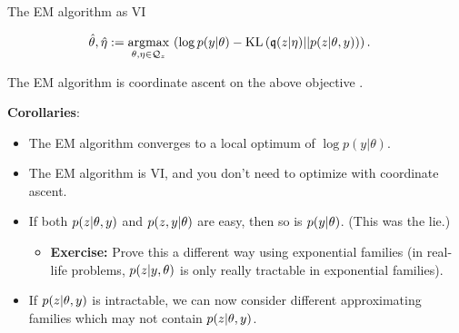 \begin{frame}{The EM algorithm as VI}

\begin{align*}
%
\thetahat, \etaopt :={}& \argmax{\theta, \eta \in \qdom_z} \left(
\log p(\y | \theta) -
    \kl{\q(\z | \eta)}{p(\z | \theta, \y)}  \right).
%
\end{align*}
%

The EM algorithm is coordinate ascent on the above objective
\citep{neal1998view}.

\textbf{Corollaries}:

\begin{itemize}
%
\item<2-> The EM algorithm converges to a local optimum of $\log p(y | \theta)$.
%
\item<3-> The EM algorithm is VI, and you don't need to optimize with coordinate
ascent.
%
\item<4-> If both $p(z | \theta, y)$ and $p(z, y | \theta )$ are easy,
then so is $p(y | \theta)$.  (This was the lie.)
\begin{itemize}
    \item<5-> \textbf{Exercise: } Prove this a different way using exponential
    families (in real-life problems, $p(z | y, \theta)$ is only
    really tractable in exponential families).
\end{itemize}
%
\item<6-> If $p(z | \theta, y)$ is intractable, we can now consider different
approximating families which may not contain $p(z | \theta, y)$.
%
\end{itemize}

\end{frame}



